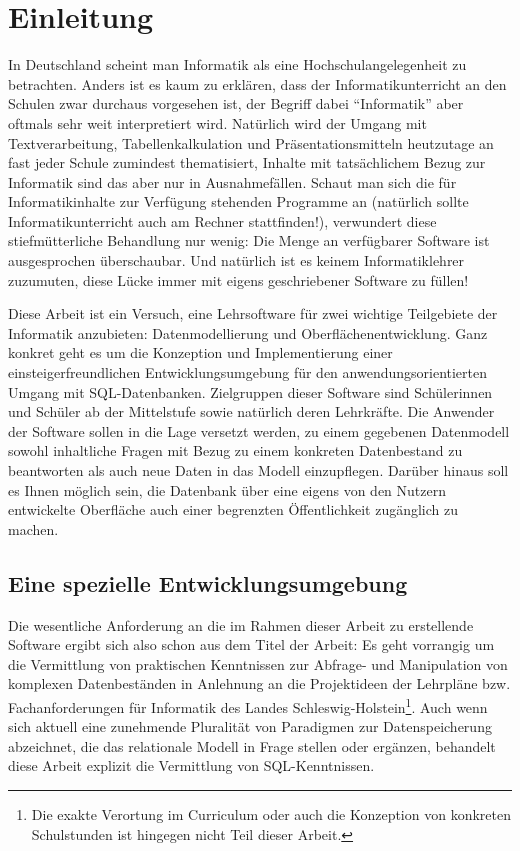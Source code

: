 \section{Einleitung}

In Deutschland scheint man Informatik als eine Hochschulangelegenheit zu betrachten. Anders ist es kaum zu erklären, dass der Informatikunterricht an den Schulen zwar durchaus vorgesehen ist, der Begriff dabei ``Informatik'' aber oftmals sehr weit interpretiert wird. Natürlich wird der Umgang mit Textverarbeitung, Tabellenkalkulation und Präsentationsmitteln heutzutage an fast jeder Schule zumindest thematisiert, Inhalte mit tatsächlichem Bezug zur Informatik sind das aber nur in Ausnahmefällen. Schaut man sich die für Informatikinhalte zur Verfügung stehenden Programme an (natürlich sollte Informatikunterricht auch am Rechner stattfinden!), verwundert diese stiefmütterliche Behandlung nur wenig: Die Menge an verfügbarer Software ist ausgesprochen überschaubar. Und natürlich ist es keinem Informatiklehrer zuzumuten, diese Lücke immer mit eigens geschriebener Software zu füllen!

Diese Arbeit ist ein Versuch, eine Lehrsoftware für zwei wichtige Teilgebiete der Informatik anzubieten: Datenmodellierung und Oberflächenentwicklung. Ganz konkret geht es um die Konzeption und Implementierung einer einsteigerfreundlichen Entwicklungsumgebung für den anwendungsorientierten Umgang mit SQL-Datenbanken. Zielgruppen dieser Software sind Schülerinnen und Schüler ab der Mittelstufe sowie natürlich deren Lehrkräfte. Die Anwender der Software sollen in die Lage versetzt werden, zu einem gegebenen Datenmodell sowohl inhaltliche Fragen mit Bezug zu einem konkreten Datenbestand zu beantworten als auch neue Daten in das Modell einzupflegen. Darüber hinaus soll es Ihnen möglich sein, die Datenbank über eine eigens von den Nutzern entwickelte Oberfläche auch einer begrenzten Öffentlichkeit zugänglich zu machen.

\subsection{Eine spezielle Entwicklungsumgebung}

Die wesentliche Anforderung an die im Rahmen dieser Arbeit zu erstellende Software ergibt sich also schon aus dem Titel der Arbeit: Es geht vorrangig um die Vermittlung von praktischen Kenntnissen zur Abfrage- und Manipulation von komplexen Datenbeständen in Anlehnung an die Projektideen der Lehrpläne \cite{lehrplan-inf-sek-1} bzw. Fachanforderungen \cite{lehrplan-inf-sek-2} für Informatik des Landes Schleswig-Holstein\footnote{Die exakte Verortung im Curriculum oder auch die Konzeption von konkreten Schulstunden ist hingegen nicht Teil dieser Arbeit.}. Auch wenn sich aktuell eine zunehmende Pluralität von Paradigmen zur Datenspeicherung abzeichnet, die das relationale Modell in Frage stellen oder ergänzen, behandelt diese Arbeit explizit die Vermittlung von SQL-Kenntnissen. 

